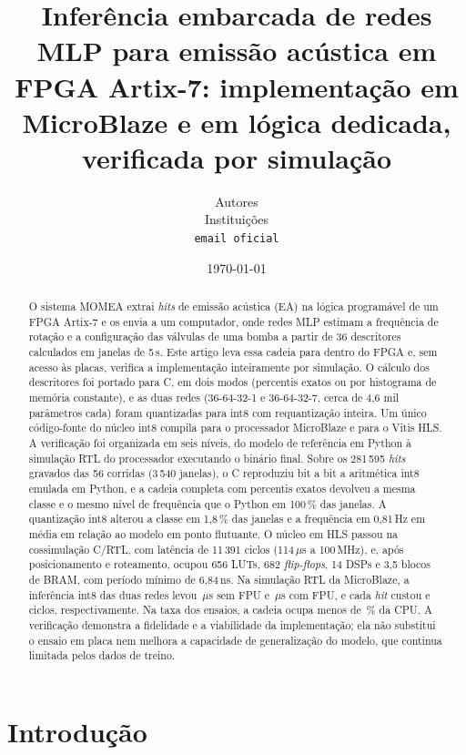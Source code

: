 \documentclass[12pt]{article}
\title{\textbf{Inferência embarcada de redes MLP para emissão acústica em FPGA Artix-7: implementação em MicroBlaze e em lógica dedicada, verificada por simulação}}
\date{\today}
\author{Autores \\ Instituições \\ \texttt{email oficial}}
\begin{document}
\maketitle

\begin{abstract}
O sistema MOMEA extrai \textit{hits} de emissão acústica (EA) na lógica programável de um FPGA Artix-7 e os envia a um computador, onde redes MLP estimam a frequência de rotação e a configuração das válvulas de uma bomba a partir de 36 descritores calculados em janelas de 5\,s. Este artigo leva essa cadeia para dentro do FPGA e, sem acesso às placas, verifica a implementação inteiramente por simulação. O cálculo dos descritores foi portado para C, em dois modos (percentis exatos ou por histograma de memória constante), e as duas redes (36-64-32-1 e 36-64-32-7, cerca de 4,6 mil parâmetros cada) foram quantizadas para int8 com requantização inteira. Um único código-fonte do núcleo int8 compila para o processador MicroBlaze e para o Vitis HLS. A verificação foi organizada em seis níveis, do modelo de referência em Python à simulação RTL do processador executando o binário final. Sobre os 281\,595 \textit{hits} gravados das 56 corridas (3\,540 janelas), o C reproduziu bit a bit a aritmética int8 emulada em Python, e a cadeia completa com percentis exatos devolveu a mesma classe e o mesmo nível de frequência que o Python em 100\,\% das janelas. A quantização int8 alterou a classe em 1,8\,\% das janelas e a frequência em 0,81\,Hz em média em relação ao modelo em ponto flutuante. O núcleo em HLS passou na cossimulação C/RTL, com latência de 11\,391 ciclos (114\,\(\mu\)s a 100\,MHz), e, após posicionamento e roteamento, ocupou 656 LUTs, 682 \textit{flip-flops}, 14 DSPs e 3,5 blocos de BRAM, com período mínimo de 6,84\,ns. Na simulação RTL da MicroBlaze, a inferência int8 das duas redes levou \mbMlpIntSoftUs\,\(\mu\)s sem FPU e \mbMlpIntFpuUs\,\(\mu\)s com FPU, e cada \textit{hit} custou \mbHitSoft{} e \mbHitFpu{} ciclos, respectivamente. Na taxa dos ensaios, a cadeia ocupa menos de \mbCargaEnsaioMax\,\% da CPU. A verificação demonstra a fidelidade e a viabilidade da implementação; ela não substitui o ensaio em placa nem melhora a capacidade de generalização do modelo, que continua limitada pelos dados de treino.
\end{abstract}

\section{Introdução}
\label{sec:introducao}
\end{document}
